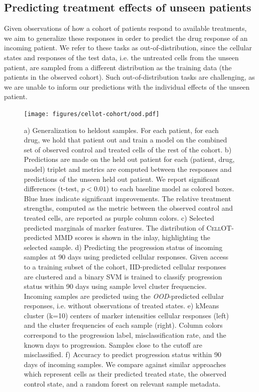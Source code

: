 \subsection{Predicting treatment effects of unseen patients}
Given observations of how a cohort of patients respond to available treatments, we aim to generalize these responses in order to predict the drug response of an incoming patient.
We refer to these tasks as out-of-distribution, since the cellular states and responses of the test data, i.e. the untreated cells from the unseen patient, are sampled from a different distribution as the training data (the patients in the observed cohort).
Such out-of-distribution tasks are challenging, as we are unable to inform our predictions with the individual effects of the unseen patient.


\begin{figure}[htp!]
  \begin{center}
    \texttt{[image: figures/cellot-cohort/ood.pdf]}
  \end{center}
  \caption{
    a) Generalization to heldout samples. For each patient, for each drug, we hold that patient out and train a model on the combined set of observed control and treated cells of the rest of the cohort.
    b) Predictions are made on the held out patient for each (patient, drug, model) triplet and metrics are computed between the responses and predictions of the unseen held out patient.
    We report significant differences (t-test, $p < 0.01$) to each baseline model as colored boxes. Blue hues indicate significant improvements.
    The relative treatment strengths, computed as the metric between the observed control and treated cells, are reported as purple column colors.
    c) Selected predicted marginals of marker features.
    The distribution of \textsc{CellOT}-predicted MMD scores is shown in the inlay, highlighting the selected sample.
    d) Predicting the progression status of incoming samples at 90 days using predicted cellular responses.
    Given access to a training subset of the cohort, IID-predicted cellular responses are clustered and a binary SVM is trained to classify progression status within 90 days using sample level cluster frequencies.
    Incoming samples are predicted using the \emph{OOD}-predicted cellular responses, i.e. without observations of treated states.
    e) kMeans cluster (k=10) centers of marker intensities cellular responses (left) and the cluster frequencies of each sample (right).
    Column colors correspond to the progression label, misclassification rate, and the known days to progression. Samples close to the cutoff are misclassified.
    f) Accuracy to predict progression status within 90 days of incoming samples.
    We compare against similar approaches which represent cells as their predicted treated state, the observed control state, and a random forest on relevant sample metadata.
  }\label{fig:ood-main}
\end{figure}

